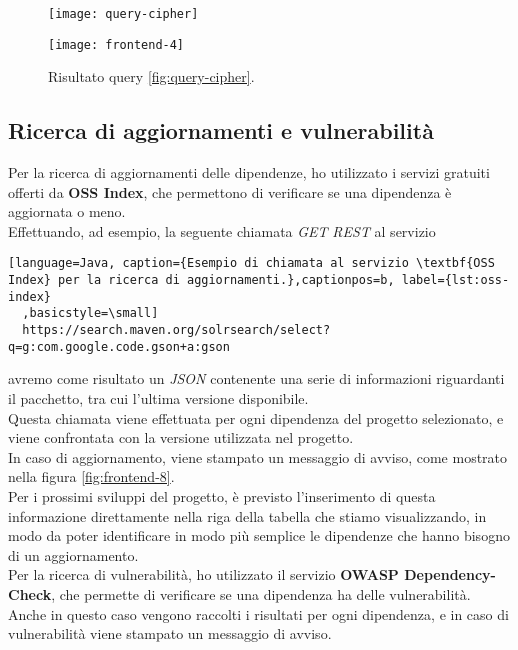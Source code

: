 \begin{figure}[h]
  \centering
  \begin{minipage}{0.550\textwidth}
      \centering
      \texttt{[image: query-cipher]} 
      \caption{Esempio di \textit{query} Cypher per l'esplorazione dell'albero delle dipendenze.}
      \label{fig:query-cipher}
  \end{minipage}\hfill
  \begin{minipage}{0.450\textwidth}
    \centering
    \texttt{[image: frontend-4]}
    \caption{Risultato query \ref*{fig:query-cipher}.}
    \label{fig:frontend-4-bis}
  \end{minipage}
\end{figure}

\subsection*{Ricerca di aggiornamenti e vulnerabilità}
Per la ricerca di aggiornamenti delle dipendenze, ho utilizzato i servizi gratuiti offerti da \textbf{OSS Index},
che permettono di verificare se una dipendenza è aggiornata o meno.\\
Effettuando, ad esempio, la seguente chiamata \textit{GET} \textit{REST} al servizio \\
\begin{lstlisting}[language=Java, caption={Esempio di chiamata al servizio \textbf{OSS Index} per la ricerca di aggiornamenti.},captionpos=b, label={lst:oss-index}
  ,basicstyle=\small]
  https://search.maven.org/solrsearch/select?q=g:com.google.code.gson+a:gson
\end{lstlisting}
avremo come risultato un \textit{JSON} contenente una serie di informazioni riguardanti il pacchetto, tra cui
l'ultima versione disponibile.\\

Questa chiamata viene effettuata per ogni dipendenza del progetto selezionato, e viene confrontata con la versione utilizzata nel progetto.\\
In caso di aggiornamento, viene stampato un messaggio di avviso, come mostrato nella figura \ref{fig:frontend-8}.\\

Per i prossimi sviluppi del progetto, è previsto l'inserimento di questa informazione direttamente nella riga della tabella 
che stiamo visualizzando, in modo da poter identificare in modo più semplice le dipendenze che hanno bisogno di un aggiornamento.\\

Per la ricerca di vulnerabilità, ho utilizzato il servizio \textbf{OWASP Dependency-Check}, che permette di verificare se una dipendenza
ha delle vulnerabilità.\\
Anche in questo caso vengono raccolti i risultati per ogni dipendenza, e in caso di vulnerabilità viene stampato un messaggio di avviso.